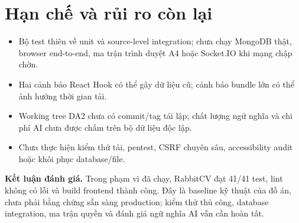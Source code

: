 \section{Hạn chế và rủi ro còn lại}

\begin{itemize}
    \item Bộ test thiên về unit và source-level integration; chưa chạy MongoDB thật, browser end-to-end, ma trận trình duyệt A4 hoặc Socket.IO khi mạng chập chờn.
    \item Hai cảnh báo React Hook có thể gây dữ liệu cũ; cảnh báo bundle lớn có thể ảnh hưởng thời gian tải.
    \item Working tree DA2 chưa có commit/tag tái lập; chất lượng ngữ nghĩa và chi phí AI chưa được chấm trên bộ dữ liệu độc lập.
    \item Chưa thực hiện kiểm thử tải, pentest, CSRF chuyên sâu, accessibility audit hoặc khôi phục database/file.
\end{itemize}

\noindent\textbf{Kết luận đánh giá.}
Trong phạm vi đã chạy, RabbitCV đạt 41/41 test, lint không có lỗi và build frontend thành công. Đây là baseline kỹ thuật của đồ án, chưa phải bằng chứng sẵn sàng production; kiểm thử thủ công, database integration, ma trận quyền và đánh giá ngữ nghĩa AI vẫn cần hoàn tất.

